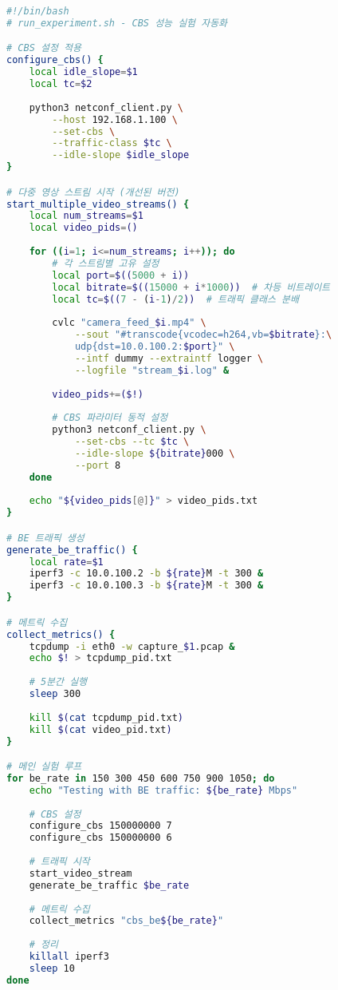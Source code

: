 \documentclass[twocolumn,10pt]{article}
\begin{document}
\begin{lstlisting}[language=bash, caption=실험 자동화 스크립트]
#!/bin/bash
# run_experiment.sh - CBS 성능 실험 자동화

# CBS 설정 적용
configure_cbs() {
    local idle_slope=$1
    local tc=$2
    
    python3 netconf_client.py \
        --host 192.168.1.100 \
        --set-cbs \
        --traffic-class $tc \
        --idle-slope $idle_slope
}

# 다중 영상 스트림 시작 (개선된 버전)
start_multiple_video_streams() {
    local num_streams=$1
    local video_pids=()
    
    for ((i=1; i<=num_streams; i++)); do
        # 각 스트림별 고유 설정
        local port=$((5000 + i))
        local bitrate=$((15000 + i*1000))  # 차등 비트레이트
        local tc=$((7 - (i-1)/2))  # 트래픽 클래스 분배
        
        cvlc "camera_feed_$i.mp4" \
            --sout "#transcode{vcodec=h264,vb=$bitrate}:\
            udp{dst=10.0.100.2:$port}" \
            --intf dummy --extraintf logger \
            --logfile "stream_$i.log" &
        
        video_pids+=($!)
        
        # CBS 파라미터 동적 설정
        python3 netconf_client.py \
            --set-cbs --tc $tc \
            --idle-slope ${bitrate}000 \
            --port 8
    done
    
    echo "${video_pids[@]}" > video_pids.txt
}

# BE 트래픽 생성
generate_be_traffic() {
    local rate=$1
    iperf3 -c 10.0.100.2 -b ${rate}M -t 300 &
    iperf3 -c 10.0.100.3 -b ${rate}M -t 300 &
}

# 메트릭 수집
collect_metrics() {
    tcpdump -i eth0 -w capture_$1.pcap &
    echo $! > tcpdump_pid.txt
    
    # 5분간 실행
    sleep 300
    
    kill $(cat tcpdump_pid.txt)
    kill $(cat video_pid.txt)
}

# 메인 실험 루프
for be_rate in 150 300 450 600 750 900 1050; do
    echo "Testing with BE traffic: ${be_rate} Mbps"
    
    # CBS 설정
    configure_cbs 150000000 7
    configure_cbs 150000000 6
    
    # 트래픽 시작
    start_video_stream
    generate_be_traffic $be_rate
    
    # 메트릭 수집
    collect_metrics "cbs_be${be_rate}"
    
    # 정리
    killall iperf3
    sleep 10
done
\end{lstlisting}
\end{document}
